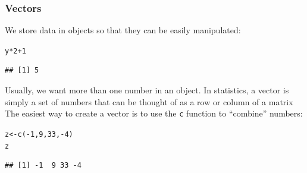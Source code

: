\documentclass[color=usenames,dvipsnames]{beamer}\usepackage[]{graphicx}\usepackage[]{color}
\makeatletter
\newcommand{\hlnum}[1]{\textcolor[rgb]{0.69,0.494,0}{#1}}%
\newcommand{\hlopt}[1]{\textcolor[rgb]{0,0,0}{#1}}%
\newcommand{\hlstd}[1]{\textcolor[rgb]{0,0,0}{#1}}%
\newcommand{\hlkwb}[1]{\textcolor[rgb]{0,0.341,0.682}{#1}}%
\newcommand{\hlkwd}[1]{\textcolor[rgb]{0.004,0.004,0.506}{#1}}%
\newenvironment{kframe}{%
 \def\at@end@of@kframe{}%
 \ifinner\ifhmode%
  \def\at@end@of@kframe{\end{minipage}}%
  \begin{minipage}{\columnwidth}%
 \fi\fi%
 \def\FrameCommand##1{\hskip\@totalleftmargin \hskip-\fboxsep
 \colorbox{shadecolor}{##1}\hskip-\fboxsep
     \hskip-\linewidth \hskip-\@totalleftmargin \hskip\columnwidth}%
 \MakeFramed {\advance\hsize-\width
   \@totalleftmargin\z@ \linewidth\hsize
   \@setminipage}}%
 {\par\unskip\endMakeFramed%
 \at@end@of@kframe}
\newenvironment{knitrout}{}{} %
\newcommand{\inr}[1]{\colorbox{inlinecolor}{\texttt{#1}}}
\makeatother
\begin{document}
\begin{frame}[fragile]
  \frametitle{Vectors}
We store data in objects so that they can be easily manipulated:
\begin{knitrout}\small
{}\color{fgcolor}\begin{kframe}
\begin{alltt}
\hlstd{y}\hlopt{*}\hlnum{2}\hlopt{+}\hlnum{1}
\end{alltt}
\begin{verbatim}
## [1] 5
\end{verbatim}
\end{kframe}
\end{knitrout}
\pause \vfill
Usually, we want more than one number in an object. In statistics, a
vector is simply a set of numbers that can be thought of as a row or
column of a matrix \\
\pause \vfill
The easiest way to create a vector is to use the \inr{c}
function to ``combine'' numbers:
\begin{knitrout}\small
{}\color{fgcolor}\begin{kframe}
\begin{alltt}
\hlstd{z} \hlkwb{<-} \hlkwd{c}\hlstd{(}\hlopt{-}\hlnum{1}\hlstd{,} \hlnum{9}\hlstd{,} \hlnum{33}\hlstd{,} \hlopt{-}\hlnum{4}\hlstd{)}
\hlstd{z}
\end{alltt}
\begin{verbatim}
## [1] -1  9 33 -4
\end{verbatim}
\end{kframe}
\end{knitrout}
\end{frame}



\end{document}
